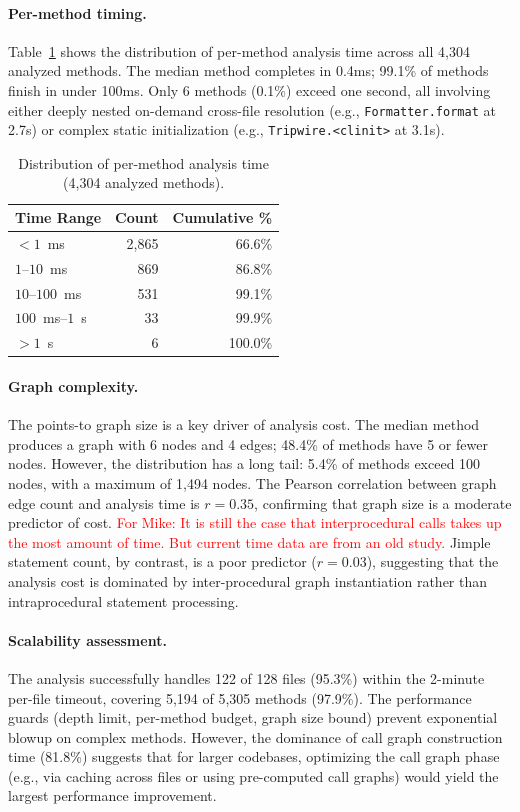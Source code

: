 \paragraph{Per-method timing.}
Table~\ref{tab:method-timing} shows the distribution of per-method analysis time across all 4,304 analyzed methods.
The median method completes in 0.4ms; 99.1\% of methods finish in under 100ms.
Only 6 methods (0.1\%) exceed one second, all involving either deeply nested on-demand cross-file resolution (e.g., \texttt{Formatter.format} at 2.7s) or complex static initialization (e.g., \texttt{Tripwire.<clinit>} at 3.1s).

\begin{table}[h]
\centering
\caption{Distribution of per-method analysis time (4,304 analyzed methods).}
\label{tab:method-timing}
\begin{tabular}{lrr}
\toprule
\textbf{Time Range} & \textbf{Count} & \textbf{Cumulative \%} \\
\midrule
$< 1$~ms          & 2,865 & 66.6\% \\
$1$--$10$~ms      &   869 & 86.8\% \\
$10$--$100$~ms    &   531 & 99.1\% \\
$100$~ms--$1$~s   &    33 & 99.9\% \\
$> 1$~s           &     6 & 100.0\% \\
\bottomrule
\end{tabular}
\end{table}

\paragraph{Graph complexity.}
The points-to graph size is a key driver of analysis cost.
The median method produces a graph with 6 nodes and 4 edges; 48.4\% of methods have 5 or fewer nodes.
However, the distribution has a long tail: 5.4\% of methods exceed 100 nodes, with a maximum of 1,494 nodes.
The Pearson correlation between graph edge count and analysis time is $r = 0.35$, confirming that graph size is a moderate predictor of cost. \textcolor{red}{For Mike: It is still the case that interprocedural calls takes up the most amount of time. But current time data are from an old study.}
Jimple statement count, by contrast, is a poor predictor ($r = 0.03$), suggesting that the analysis cost is dominated by inter-procedural graph instantiation rather than intraprocedural statement processing.

\paragraph{Scalability assessment.}
The analysis successfully handles 122 of 128 files (95.3\%) within the 2-minute per-file timeout, covering 5,194 of 5,305 methods (97.9\%).
The performance guards (depth limit, per-method budget, graph size bound) prevent exponential blowup on complex methods.
However, the dominance of call graph construction time (81.8\%) suggests that for larger codebases, optimizing the call graph phase (e.g., via caching across files or using pre-computed call graphs) would yield the largest performance improvement.


